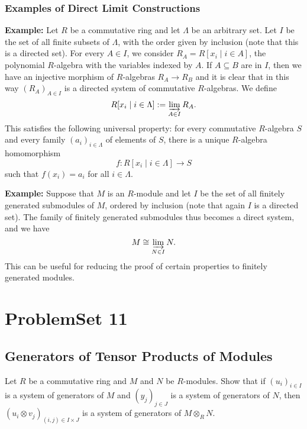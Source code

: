 \documentclass[lang=cn,11pt]{template}
\begin{document}
\subsection*{Examples of Direct Limit Constructions}
\textbf{Example:} Let \( R \) be a commutative ring and let \( \Lambda \) be an arbitrary set. Let \( I \) be the set of all finite subsets of \( \Lambda \), with the order given by inclusion (note that this is a directed set). For every \( A \in I \), we consider \( R_A = R[x_i \mid i \in A] \), the polynomial \( R \)-algebra with the variables indexed by \( A \). If \( A \subseteq B \) are in \( I \), then we have an injective morphism of \( R \)-algebras \( R_A \rightarrow R_B \) and it is clear that in this way \( (R_A)_{A \in I} \) is a directed system of commutative \( R \)-algebras. We define
\[
R[x_i \mid i \in \Lambda] := \varinjlim_{A \in I} R_A.
\]
This satisfies the following universal property: for every commutative \( R \)-algebra \( S \) and every family \( (a_i)_{i \in \Lambda} \) of elements of \( S \), there is a unique \( R \)-algebra homomorphism
\[
f : R[x_i \mid i \in \Lambda] \rightarrow S
\]
such that \( f(x_i) = a_i \) for all \( i \in \Lambda \).

\textbf{Example:} Suppose that \( M \) is an \( R \)-module and let \( I \) be the set of all finitely generated submodules of \( M \), ordered by inclusion (note that again \( I \) is a directed set). The family of finitely generated submodules thus becomes a direct system, and we have
\[
M \cong \varinjlim_{N \in I} N.
\]
This can be useful for reducing the proof of certain properties to finitely generated modules.






\chapter{ProblemSet 11}

\section{Generators of Tensor Products of Modules}
Let \( R \) be a commutative ring and \( M \) and \( N \) be \( R \)-modules. Show that if \( (u_i)_{i \in I} \) is a system of generators of \( M \) and \( (y_j)_{j \in J} \) is a system of generators of \( N \), then \( (u_i \otimes v_j)_{(i,j) \in I \times J} \) is a system of generators of \( M \otimes_R N \).
\end{document}
